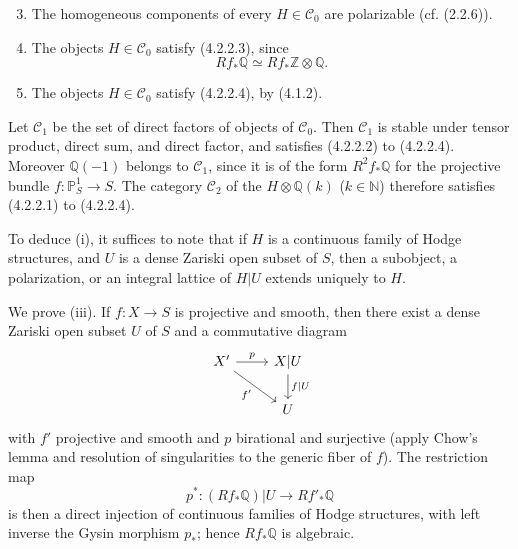 \documentclass[10pt]{article}
\newcommand{\Q}{\mathbb Q}
\newcommand{\Z}{\mathbb Z}
\newcommand{\N}{\mathbb N}
\newcommand{\bbP}{\mathbb P}
\begin{document}
\begin{enumerate}[label=\alph*)]
\setcounter{enumi}{2}
\item The homogeneous components of every $H\in\mathcal C_0$ are polarizable (cf. (2.2.6)).
\item The objects $H\in\mathcal C_0$ satisfy (4.2.2.3), since
\[
Rf_*\Q\simeq Rf_*\Z\otimes\Q.
\]
\item The objects $H\in\mathcal C_0$ satisfy (4.2.2.4), by (4.1.2).
\end{enumerate}
Let $\mathcal C_1$ be the set of direct factors of objects of $\mathcal C_0$. Then $\mathcal C_1$ is stable under tensor product, direct sum, and direct factor, and satisfies (4.2.2.2) to (4.2.2.4). Moreover $\Q(-1)$ belongs to $\mathcal C_1$, since it is of the form $R^2f_*\Q$ for the projective bundle $f:\bbP^1_S\to S$. The category $\mathcal C_2$ of the $H\otimes\Q(k)$ ($k\in\N$) therefore satisfies (4.2.2.1) to (4.2.2.4).

To deduce (i), it suffices to note that if $H$ is a continuous family of Hodge structures, and $U$ is a dense Zariski open subset of $S$, then a subobject, a polarization, or an integral lattice of $H|U$ extends uniquely to $H$.

We prove (iii). If $f:X\to S$ is projective and smooth, then there exist a dense Zariski open subset $U$ of $S$ and a commutative diagram
\[
\begin{tikzcd}[column sep=2.3em,row sep=1.8em]
X' \arrow[r,"p"] \arrow[dr,"f'"'] & X|U \arrow[d,"f|U"]\\
& U
\end{tikzcd}
\]
with $f'$ projective and smooth and $p$ birational and surjective (apply Chow's lemma and resolution of singularities to the generic fiber of $f$). The restriction map
\[
p^*:(Rf_*\Q)|U\longrightarrow Rf'_*\Q
\]
is then a direct injection of continuous families of Hodge structures, with left inverse the Gysin morphism $p_*$; hence $Rf_*\Q$ is algebraic.
\end{document}
